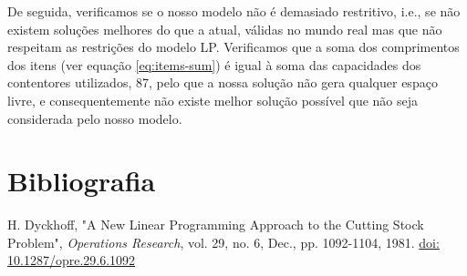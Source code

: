 \documentclass[12pt, a4paper, titlepage]{article}
\begin{document}
De seguida, verificamos se o nosso modelo não é demasiado restritivo, i.e., se não existem soluções
melhores do que a atual, válidas no mundo real mas que não respeitam as restrições do modelo LP.
Verificamos que a soma dos comprimentos dos itens (ver equação \ref{eq:items-sum}) é igual à soma
das capacidades dos contentores utilizados, 87, pelo que a nossa solução não gera qualquer espaço
livre, e consequentemente não existe melhor solução possível que não seja considerada pelo nosso
modelo.

\section{Bibliografia}
\def\refname{}
\vspace{-1.5cm}
\begin{thebibliography}{9}
    H. Dyckhoff, "A New Linear Programming Approach to the Cutting Stock Problem",
    \emph{Operations Research}, vol. 29, no. 6, Dec., pp. 1092-1104, 1981.
    \href{https://doi.org/10.1287/opre.29.6.1092}{doi: 10.1287/opre.29.6.1092}
\end{thebibliography}
\end{document}

